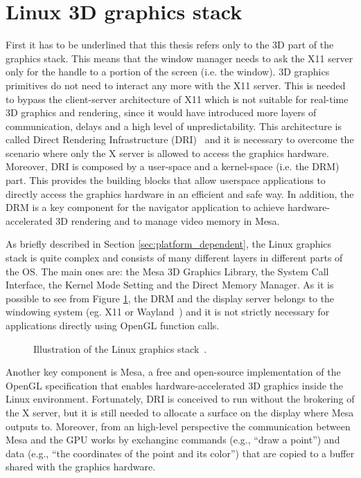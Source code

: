 \section{Linux 3D graphics stack}
First it has to be underlined that this thesis refers only to the 3D part of the
graphics stack. This means that the window manager needs to ask the X11 server
only for the handle to a portion of the screen (i.e. the window).
3D graphics primitives do not need to interact any more with the X11 server. This
is needed to bypass the client-server architecture of X11 which is not suitable for
real-time 3D graphics and rendering, since it would have introduced more layers
of communication, delays and a high level of unpredictability.
This architecture is called
Direct Rendering Infrastructure (DRI)~\cite{paul2000introduction} and it is
necessary to overcome the scenario where only the X server is allowed to access
the graphics hardware. Moreover, DRI is composed by a user-space and a kernel-space
(i.e. the DRM) part. This provides the building blocks that allow userspace applications
to directly access the graphics hardware in an efficient and safe way.
In addition, the DRM is a key component for the navigator application to achieve
hardware-accelerated 3D rendering and to manage video memory in Mesa.

As briefly described in Section \ref{sec:platform_dependent}, the Linux graphics
stack is quite complex and consists of many different layers in different parts
of the OS. The main ones are: the Mesa 3D Graphics Library, the System Call
Interface, the Kernel Mode Setting and the Direct Memory Manager.
As it is possible to see from Figure \ref{img:linux_graphics_stack}, the DRM and 
the display server belongs to the windowing system (eg. X11 or Wayland~\cite{wayland}) 
and it is not strictly necessary for applications directly using OpenGL function
calls.
\begin{figure}[!htb]
    \caption{Illustration of the Linux graphics stack~\cite{fig_linux_graphics_stack}.}
    \label{img:linux_graphics_stack}
\end{figure}

Another key component is Mesa, a free and open-source implementation of the
OpenGL specification that enables hardware-accelerated 3D graphics inside the
Linux environment. Fortunately,
DRI is conceived to run without the brokering of the X server, but it is still
needed to allocate a surface on the display where Mesa outputs to. Moreover, from
an high-level perspective the communication between Mesa and the GPU works by
exchanginc commands (e.g., ``draw a point'') and data (e.g., ``the coordinates of the
point and its color'') that are copied to a buffer shared with the graphics hardware.



